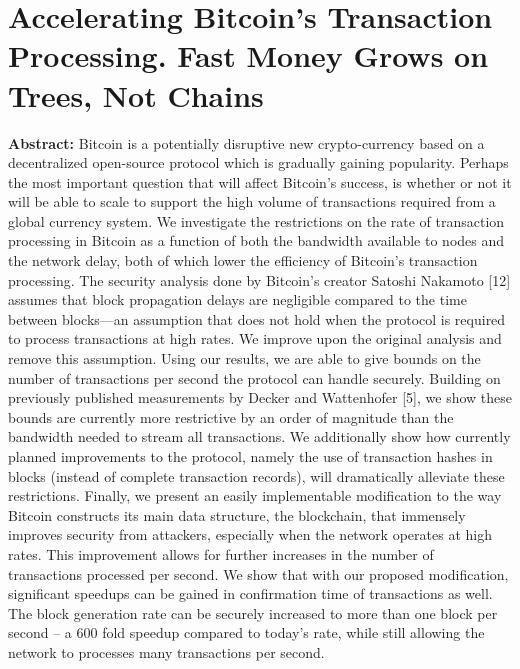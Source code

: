 \section{Accelerating Bitcoin's Transaction Processing. Fast Money Grows on Trees, Not Chains}

\textbf{Abstract:} 
Bitcoin is a potentially disruptive new crypto-currency based on a decentralized open-source protocol which is gradually gaining popularity. Perhaps the most important question that will affect Bitcoin’s success, is whether or not it will be able to scale to support the high volume of transactions required from a global currency system. We investigate the restrictions on the rate of transaction processing in Bitcoin as a function of both the bandwidth available to nodes and the network delay, both of which lower the efficiency of Bitcoin’s transaction processing. The security analysis done by Bitcoin’s creator Satoshi Nakamoto [12] assumes that block propagation delays are negligible compared to the time between blocks—an assumption that does not hold when the protocol is required to process transactions at high rates. We improve upon the original analysis and remove this assumption. Using our results, we are able to give bounds on the number of transactions per second the protocol can handle securely. Building on previously published measurements by Decker and Wattenhofer [5], we show these bounds are currently more restrictive by an order of magnitude than the bandwidth needed to stream all transactions. We additionally show how currently planned improvements to the protocol, namely the use of transaction hashes in blocks (instead of complete transaction records), will dramatically alleviate these restrictions. Finally, we present an easily implementable modification to the way Bitcoin constructs its main data structure, the blockchain, that immensely improves security from attackers, especially when the network operates at high rates. This improvement allows for further increases in the number of transactions processed per second. We show that with our proposed modification, significant speedups can be gained in confirmation time of transactions as well. The block generation rate can be securely increased to more than one block per second – a 600 fold speedup compared to today’s rate, while still allowing the network to processes many transactions per second.
